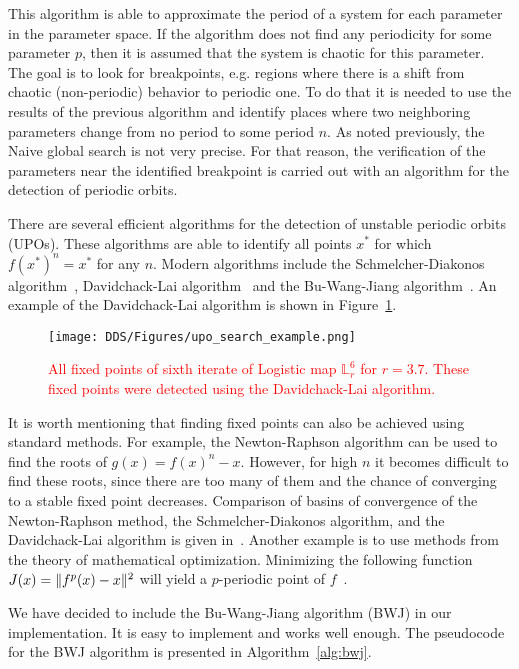 This algorithm is able to approximate the period of a system for each parameter in the parameter space.
If the algorithm does not find any periodicity for some parameter $p$, then it is assumed that the system is chaotic for this parameter.
The goal is to look for breakpoints, e.g. regions where there is a shift from chaotic (non-periodic) behavior to periodic one.
To do that it is needed to use the results of the previous algorithm and identify places where two neighboring parameters change from no period to some period $n$.
As noted previously, the Naive global search is not very precise. For that reason, the verification of the parameters near the identified breakpoint is carried out with an algorithm for the detection of periodic orbits.
\par
There are several efficient algorithms for the detection of unstable periodic orbits (UPOs).
These algorithms are able to identify all points $x^{*}$ for which $f(x^{*})^{n}=x^{*}$ for any $n$.
Modern algorithms include the Schmelcher-Diakonos algorithm~\cite{Schmelcher1997}, Davidchack-Lai algorithm~\cite{Davidchack1999, Davidchack2001, Klebanoff2001, Crofts2007} and the Bu-Wang-Jiang algorithm~\cite{Bu2004}.
An example of the Davidchack-Lai algorithm is shown in Figure~\ref{fig:upo_search_example}.

\begin{figure}[!h]
    \centering
    \texttt{[image: DDS/Figures/upo\_search\_example.png]}
    \caption{
        \textcolor{red}{
        All fixed points of sixth iterate of Logistic map $\mathbb{L}_{r}^{6}$ for $r = 3.7$.
        These fixed points were detected using the Davidchack-Lai algorithm.
        }
    }
    \label{fig:upo_search_example}
\end{figure}

\par
It is worth mentioning that finding fixed points can also be achieved using standard methods.
For example, the Newton-Raphson algorithm can be used to find the roots of $g(x) = f(x)^{n} - x$.
However, for high $n$ it becomes difficult to find these roots, since there are too many of them and the chance of converging to a stable fixed point decreases.
Comparison of basins of convergence of the Newton-Raphson method, the Schmelcher-Diakonos algorithm, and the Davidchack-Lai algorithm is given in~\cite{Davidchack1999}.
Another example is to use methods from the theory of mathematical optimization.
Minimizing the following function $J(x)= \lVert f^{p}(x)-x\rVert^{2}$ will yield a $p$-periodic point of $f$~\cite{Fuh2009}.
\par
We have decided to include the Bu-Wang-Jiang algorithm (BWJ) in our implementation.
It is easy to implement and works well enough.
The pseudocode for the BWJ algorithm is presented in Algorithm~\ref{alg:bwj}.

